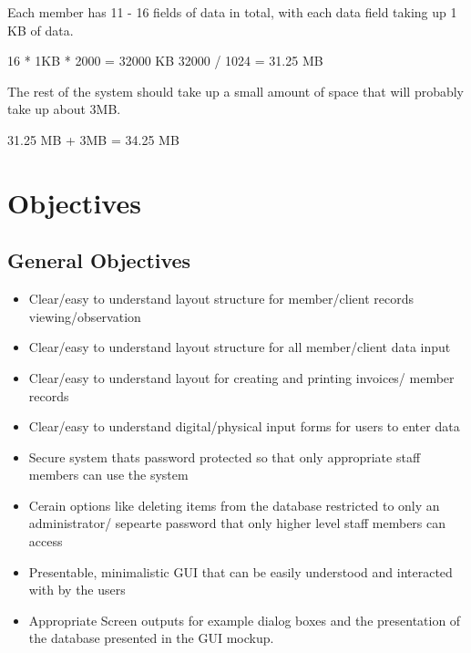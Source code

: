 Each member has 11 - 16 fields of data in total, with each data field taking up 1 KB of data.

16 * 1KB * 2000 = 32000 KB
32000 / 1024 = 31.25 MB

The rest of the system should take up a small amount of space that will probably take up about 3MB.

31.25 MB + 3MB = 34.25 MB

\section{Objectives}

\subsection{General Objectives}

    \begin{itemize}  

        \item Clear/easy to understand layout structure for member/client records viewing/observation 

        \item Clear/easy to understand layout structure for all member/client data input  

        \item Clear/easy to understand layout for creating and printing invoices/ member records
        
        \item Clear/easy to understand digital/physical input forms for users to enter data
        
        \item Secure system thats password protected so that only appropriate staff members can use the system
        
        \item Cerain options like deleting items from the database restricted to only an administrator/ sepearte password that only higher level staff members can access
        
        \item Presentable, minimalistic GUI that can be easily understood and interacted with by the users 
        
        \item Appropriate Screen outputs for example dialog boxes and the presentation of the database presented in the GUI mockup.

    \end{itemize}

